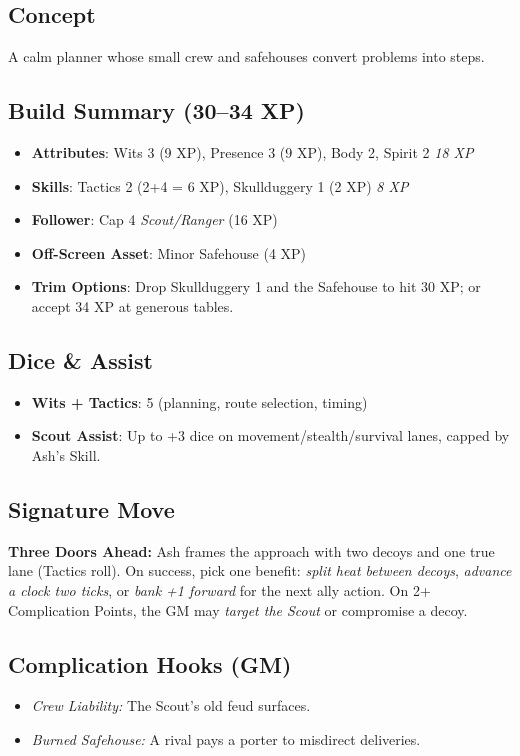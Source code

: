 \documentclass[12pt]{article}
\begin{document}
\subsection*{Concept}
A calm planner whose small crew and safehouses convert problems into steps.

\subsection*{Build Summary (30–34 XP)}
\begin{itemize}
  \item \textbf{Attributes}: Wits 3 (9 XP), Presence 3 (9 XP), Body 2, Spirit 2 \hfill \emph{18 XP}
  \item \textbf{Skills}: Tactics 2 (2+4 = 6 XP), Skullduggery 1 (2 XP) \hfill \emph{8 XP}
  \item \textbf{Follower}: Cap 4 \emph{Scout/Ranger} (16 XP)
  \item \textbf{Off-Screen Asset}: Minor Safehouse (4 XP)
  \item \textbf{Trim Options}: Drop Skullduggery 1 and the Safehouse to hit 30 XP; or accept 34 XP at generous tables.
\end{itemize}

\subsection*{Dice \& Assist}
\begin{itemize}
  \item \textbf{Wits + Tactics}: 5 (planning, route selection, timing)
  \item \textbf{Scout Assist}: Up to +3 dice on movement/stealth/survival lanes, capped by Ash’s Skill.
\end{itemize}

\subsection*{Signature Move}
\textbf{Three Doors Ahead:} Ash frames the approach with two decoys and one true lane (Tactics roll). On success, pick one benefit: \emph{split heat between decoys}, \emph{advance a clock two ticks}, or \emph{bank +1 forward} for the next ally action. On 2+ Complication Points, the GM may \emph{target the Scout} or compromise a decoy.

\subsection*{Complication Hooks (GM)}
\begin{itemize}
  \item \emph{Crew Liability:} The Scout’s old feud surfaces.
  \item \emph{Burned Safehouse:} A rival pays a porter to misdirect deliveries.
\end{itemize}
\end{document}
